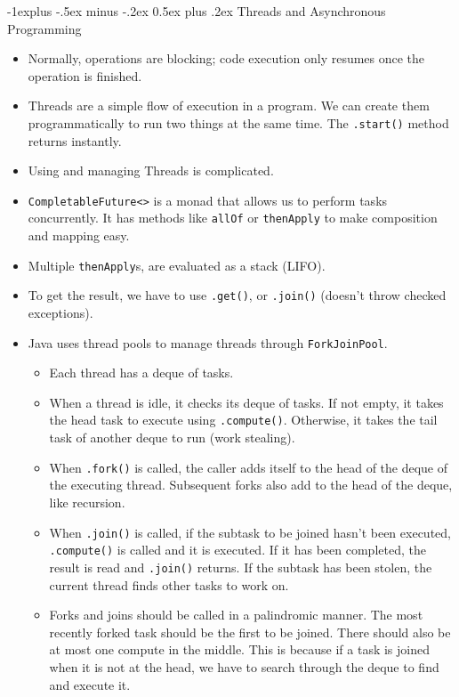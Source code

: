 \documentclass[10pt, landscape]{article}
\makeatletter
\renewcommand{\section}{\@startsection{section}{1}{0mm}%
                                {-1ex plus -.5ex minus -.2ex}%
                                {0.5ex plus .2ex}%
                                {\normalfont\large\bfseries}}
\renewcommand{\section}{\@startsection{section}{2}{0mm}%
                                {-1explus -.5ex minus -.2ex}%
                                {0.5ex plus .2ex}%
                                {\normalfont\normalsize\bfseries}}
\makeatother
\begin{document}
\begin{multicols*}{4}
\section{Threads and Asynchronous Programming}
\begin{itemize}
    \item Normally, operations are blocking; code execution only resumes once the operation is finished.
    \item Threads are a simple flow of execution in a program. We can create them programmatically to run two things at the same time. The \verb|.start()| method returns instantly.
    \item Using and managing Threads is complicated.
    \item \verb|CompletableFuture<>| is a monad that allows us to perform tasks concurrently. It has methods like \verb|allOf| or \verb|thenApply| to make composition and mapping easy.
    \item Multiple \verb|thenApply|s, are evaluated as a stack (LIFO).
    \item To get the result, we have to use \verb|.get()|, or \verb|.join()| (doesn't throw checked exceptions).
    \item Java uses thread pools to manage threads through \verb|ForkJoinPool|.
    \begin{itemize}
        \item Each thread has a deque of tasks.
        \item When a thread is idle, it checks its deque of tasks. If not empty, it takes the head task to execute using \verb|.compute()|. Otherwise, it takes the tail task of another deque to run (work stealing).
        \item When \verb|.fork()| is called, the caller adds itself to the head of the deque of the executing thread. Subsequent forks also add to the head of the deque, like recursion.
        \item When \verb|.join()| is called, if the subtask to be joined hasn't been executed, \verb|.compute()| is called and it is executed. If it has been completed, the result is read and \verb|.join()| returns. If the subtask has been stolen, the current thread finds other tasks to work on.
        \item Forks and joins should be called in a palindromic manner. The most recently forked task should be the first to be joined. There should also be at most one compute in the middle. This is because if a task is joined when it is not at the head, we have to search through the deque to find and execute it.
    \end{itemize}
\end{itemize}


\end{multicols*}
\end{document}

